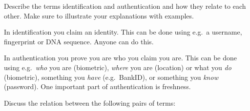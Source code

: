 \question[3]
  Describe the terms identification and authentication and how they relate to 
  each other.
  Make sure to illustrate your explanations with examples.

  \begin{solution}
    In identification you claim an identity.
    This can be done using e.g.\ a username, fingerprint or DNA sequence.
    Anyone can do this.

    In authentication you prove you are who you claim you are.
    This can be done using e.g.\ \emph{who} you are (biometric), \emph{where} 
    you are (location) or what you \emph{do} (biometric), something you 
    \emph{have} (e.g.~BankID), or something you \emph{know} (password).
    One important part of authentication is freshness.
  \end{solution}


  
\question[3]
Discuss the relation between the following pairs of terms:


